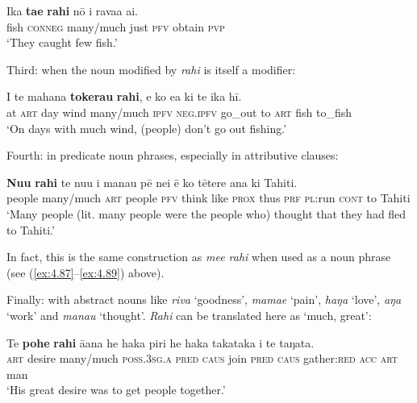 \ea\label{ex:4.103}
\gll Ika \textbf{ta{\ꞌ}e} \textbf{rahi} nō i rava{\ꞌ}a ai. \\
fish \textsc{conneg} many/much just \textsc{pfv} obtain \textsc{pvp} \\

\glt
‘They caught few fish.’ \textstyleExampleref{[R312.010]} 
\z

Third: when the noun modified by \textit{rahi} is itself a modifier:

\ea\label{ex:4.104}
\gll {\ꞌ}I te mahana \textbf{tokerau} \textbf{rahi}, e ko e{\ꞌ}a ki te ika hī. \\
at \textsc{art} day wind many/much \textsc{ipfv} \textsc{neg.ipfv} go\_out to \textsc{art} fish to\_fish \\

\glt
‘On days with much wind, (people) don’t go out fishing.’ \textstyleExampleref{[R334.254]} 
\z

Fourth: in predicate noun phrases, especially in attributive clauses:

\ea\label{ex:4.105}
\gll \textbf{Nu{\ꞌ}u} \textbf{rahi} te nu{\ꞌ}u i mana{\ꞌ}u pē nei ē ko tētere {\ꞌ}ana ki Tahiti. \\
people many/much \textsc{art} people \textsc{pfv} think like \textsc{prox} thus \textsc{prf} \textsc{pl}:run \textsc{cont} to Tahiti \\

\glt
‘Many people (lit. many people were the people who) thought that they had fled to Tahiti.’ \textstyleExampleref{[R303.051]} 
\z

In fact, this is the same construction as \textit{me{\ꞌ}e rahi} when used as a noun phrase (see (\ref{ex:4.87}–\ref{ex:4.89}) above).

Finally: with abstract nouns like \textit{riva} ‘goodness’, \textit{mamae} ‘pain’, \textit{haŋa} ‘love’, \textit{aŋa} ‘work’ and \textit{mana{\ꞌ}u} ‘thought’. \textit{Rahi} can be translated here as ‘much, great’:

\ea\label{ex:4.106}
\gll Te \textbf{pohe} \textbf{rahi} {\ꞌ}ā{\ꞌ}ana he haka piri he haka takataka  i te taŋata.\\
\textsc{art} desire many/much \textsc{poss.3sg.a} \textsc{pred} \textsc{caus} join \textsc{pred} \textsc{caus} gather:\textsc{red}  \textsc{acc} \textsc{art} man\\

\glt 
‘His great desire was to get people together.’ \textstyleExampleref{[R302.039]} 
\z

